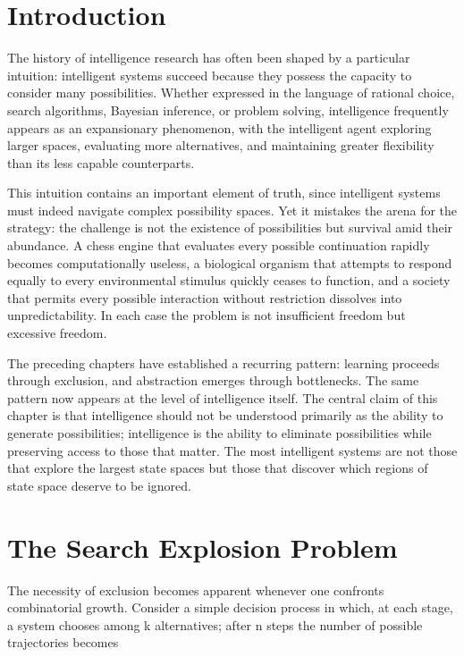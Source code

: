 \documentclass[11pt,oneside]{book}
\theoremstyle{plain}
\theoremstyle{definition}
\theoremstyle{remark}
\begin{document}
\section{Introduction}

The history of intelligence research has often been shaped by a particular intuition: intelligent systems succeed because they possess the capacity to consider many possibilities. Whether expressed in the language of rational choice, search algorithms, Bayesian inference, or problem solving, intelligence frequently appears as an expansionary phenomenon, with the intelligent agent exploring larger spaces, evaluating more alternatives, and maintaining greater flexibility than its less capable counterparts.

This intuition contains an important element of truth, since intelligent systems must indeed navigate complex possibility spaces. Yet it mistakes the arena for the strategy: the challenge is not the existence of possibilities but survival amid their abundance. A chess engine that evaluates every possible continuation rapidly becomes computationally useless, a biological organism that attempts to respond equally to every environmental stimulus quickly ceases to function, and a society that permits every possible interaction without restriction dissolves into unpredictability. In each case the problem is not insufficient freedom but excessive freedom.

The preceding chapters have established a recurring pattern: learning proceeds through exclusion, and abstraction emerges through bottlenecks. The same pattern now appears at the level of intelligence itself. The central claim of this chapter is that intelligence should not be understood primarily as the ability to generate possibilities; intelligence is the ability to eliminate possibilities while preserving access to those that matter. The most intelligent systems are not those that explore the largest state spaces but those that discover which regions of state space deserve to be ignored.

\section{The Search Explosion Problem}

The necessity of exclusion becomes apparent whenever one confronts combinatorial growth. Consider a simple decision process in which, at each stage, a system chooses among k alternatives; after n steps the number of possible trajectories becomes
\end{document}
